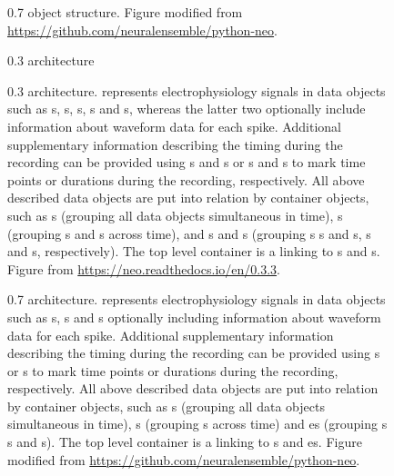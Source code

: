 \begin{figure}
    \centering
    
    \caption[ 0.7 object structure]{ 0.7 object structure. Figure modified from \url{https://github.com/neuralensemble/python-neo}.}
    \label{fig:neo_uml}
\end{figure}

\begin{figure}
    \centering
     0.3 architecture
    
    \caption[ 0.3 architecture]{ 0.3 architecture.  represents electrophysiology signals in data objects such as s, s, s, s and s, whereas the latter two optionally include information about waveform data for each spike. Additional supplementary information describing the timing during the recording can be provided using s and s or s and s to mark time points or durations during the recording, respectively. All above described data objects are put into relation by container objects, such as s (grouping all data objects simultaneous in time), s (grouping s and s across time), and s and s (grouping s s and s, s and s, respectively). The top level container is a  linking to s and s. Figure from \url{https://neo.readthedocs.io/en/0.3.3}.}
    \label{fig:neo_architecture03}
\end{figure}


\begin{figure}
    \centering
    
    \caption[ 0.7 architecture]{ 0.7 architecture.  represents electrophysiology signals in data objects such as s, s and s optionally including information about waveform data for each spike. Additional supplementary information describing the timing during the recording can be provided using s or s to mark time points or durations during the recording, respectively. All above described data objects are put into relation by container objects, such as s (grouping all data objects simultaneous in time), s (grouping s across time) and es (grouping s s and s). The top level container is a  linking to s and es. Figure modified from \url{https://github.com/neuralensemble/python-neo}.}
    \label{fig:neo_architecture07}
\end{figure}


